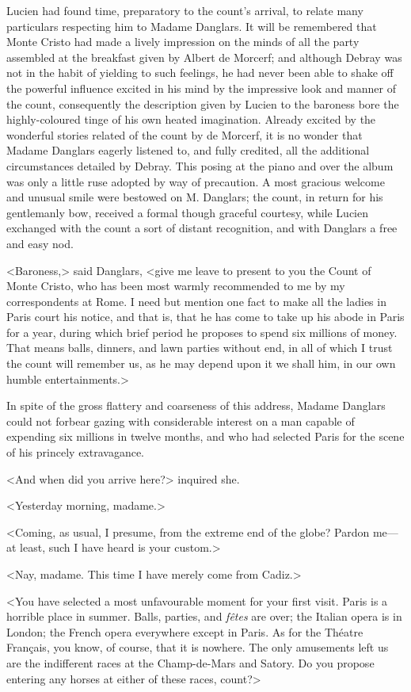  Lucien had found time, preparatory to the count's arrival, to relate many particulars respecting him to Madame Danglars. It will be remembered that Monte Cristo had made a lively impression on the minds of all the party assembled at the breakfast given by Albert de Morcerf; and although Debray was not in the habit of yielding to such feelings, he had never been able to shake off the powerful influence excited in his mind by the impressive look and manner of the count, consequently the description given by Lucien to the baroness bore the highly-coloured tinge of his own heated imagination. Already excited by the wonderful stories related of the count by de Morcerf, it is no wonder that Madame Danglars eagerly listened to, and fully credited, all the additional circumstances detailed by Debray. This posing at the piano and over the album was only a little ruse adopted by way of precaution. A most gracious welcome and unusual smile were bestowed on M. Danglars; the count, in return for his gentlemanly bow, received a formal though graceful courtesy, while Lucien exchanged with the count a sort of distant recognition, and with Danglars a free and easy nod. 

 <Baroness,> said Danglars, <give me leave to present to you the Count of Monte Cristo, who has been most warmly recommended to me by my correspondents at Rome. I need but mention one fact to make all the ladies in Paris court his notice, and that is, that he has come to take up his abode in Paris for a year, during which brief period he proposes to spend six millions of money. That means balls, dinners, and lawn parties without end, in all of which I trust the count will remember us, as he may depend upon it we shall him, in our own humble entertainments.> 

 In spite of the gross flattery and coarseness of this address, Madame Danglars could not forbear gazing with considerable interest on a man capable of expending six millions in twelve months, and who had selected Paris for the scene of his princely extravagance. 

 <And when did you arrive here?> inquired she. 

 <Yesterday morning, madame.> 

 <Coming, as usual, I presume, from the extreme end of the globe? Pardon me—at least, such I have heard is your custom.> 

 <Nay, madame. This time I have merely come from Cadiz.> 

 <You have selected a most unfavourable moment for your first visit. Paris is a horrible place in summer. Balls, parties, and \textit{fêtes} are over; the Italian opera is in London; the French opera everywhere except in Paris. As for the Théatre Français, you know, of course, that it is nowhere. The only amusements left us are the indifferent races at the Champ-de-Mars and Satory. Do you propose entering any horses at either of these races, count?> 

